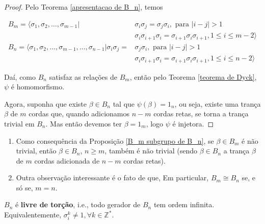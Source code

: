 	
	\begin{proof}
		Pelo Teorema \eqref{apresentacao de B_n}, temos
		
		\begin{align*}
		B_m = \langle \sigma_1, \sigma_2, \dots, \sigma_{m-1} | &\sigma_i\sigma_j = \sigma_j\sigma_i, \text{ para }|i-j|>1 \\ 
		&\sigma_i\sigma_{i+1}\sigma_i = \sigma_{i+1}\sigma_i\sigma_{i+1}, 1\leq i\leq m-2\rangle \\
		B_n = \langle \sigma_1, \sigma_2, \dots, \sigma_{m-1}, \dots, \sigma_{n-1} | \sigma_i\sigma_j = &\sigma_j\sigma_i, \text{ para }|i-j|>1 \\ 
		&\sigma_i\sigma_{i+1}\sigma_i = \sigma_{i+1}\sigma_i\sigma_{i+1}, 1\leq i\leq n-2\rangle
		\end{align*} 
		
		\par\vspace{0.3cm} Daí, como $B_n$ satisfaz as relações de $B_m$, então pelo Teorema \eqref{teorema de Dyck}, $\psi$ é homomorfismo.
		
		\par\vspace{0.3cm} Agora, suponha que existe $\beta\in B_n$ tal que $\psi(\beta) = 1_n$, ou seja, existe uma trança $\beta$ de $m$ cordas que, quando adicionamos $n-m$ cordas retas, se torna a trança trivial em $B_n$. Mas então devemos ter $\beta = 1_m$, logo $\psi$ é injetora.
		
	\end{proof}
	
	\begin{remark}
		\begin{enumerate}
			\item Como consequência da Proposição \eqref{B_m subgrupo de B_n}, se $\beta\in B_m$ é não trivial, então $\beta\in B_n$, $n\geq m$, também é não trivial (sendo $\beta\in B_n$ a trança $\beta$ de $m$ cordas adicionada de $n-m$ cordas retas).
			\item Outra observação interessante é o fato de que, Em particular, $B_m\cong B_n$ se, e só se, $m=n$.
		\end{enumerate}
	\end{remark}
	
	\begin{prop}
		\label{geradores de B_n tem ordem infinita}
		$B_n$ é \textbf{livre de torção}, i.e., todo gerador de $B_n$ tem ordem infinita. Equivalentemente, $\sigma_i^k \neq 1, \forall k\in\mathbb{Z}^{\ast}$.
	\end{prop}
	
